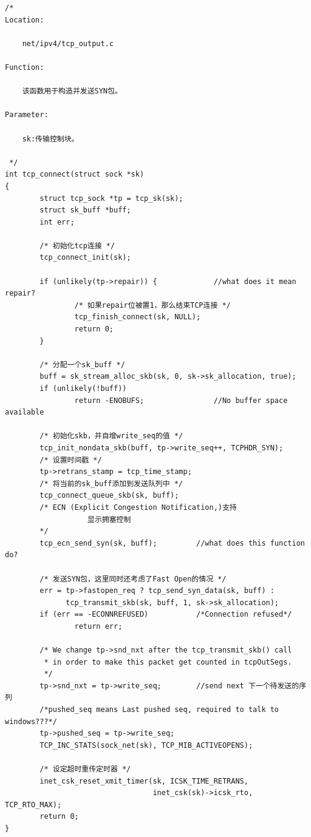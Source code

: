 \begin{verbatim}
/* 
Location:

    net/ipv4/tcp_output.c

Function:

    该函数用于构造并发送SYN包。

Parameter:

    sk:传输控制块。

 */
int tcp_connect(struct sock *sk)
{
        struct tcp_sock *tp = tcp_sk(sk);
        struct sk_buff *buff;
        int err;

        /* 初始化tcp连接 */
        tcp_connect_init(sk);

        if (unlikely(tp->repair)) {             //what does it mean repair?
                /* 如果repair位被置1，那么结束TCP连接 */
                tcp_finish_connect(sk, NULL);
                return 0;
        }

        /* 分配一个sk_buff */
        buff = sk_stream_alloc_skb(sk, 0, sk->sk_allocation, true);
        if (unlikely(!buff))
                return -ENOBUFS;                //No buffer space available

        /* 初始化skb，并自增write_seq的值 */
        tcp_init_nondata_skb(buff, tp->write_seq++, TCPHDR_SYN);
        /* 设置时间戳 */
        tp->retrans_stamp = tcp_time_stamp;
        /* 将当前的sk_buff添加到发送队列中 */
        tcp_connect_queue_skb(sk, buff);
        /* ECN (Explicit Congestion Notification,)支持 
                   显示拥塞控制
        */
        tcp_ecn_send_syn(sk, buff);         //what does this function do?

        /* 发送SYN包，这里同时还考虑了Fast Open的情况 */
        err = tp->fastopen_req ? tcp_send_syn_data(sk, buff) :
              tcp_transmit_skb(sk, buff, 1, sk->sk_allocation);
        if (err == -ECONNREFUSED)           /*Connection refused*/
                return err;

        /* We change tp->snd_nxt after the tcp_transmit_skb() call
         * in order to make this packet get counted in tcpOutSegs.
         */
        tp->snd_nxt = tp->write_seq;        //send next 下一个待发送的序列
        /*pushed_seq means Last pushed seq, required to talk to windows???*/        
        tp->pushed_seq = tp->write_seq;
        TCP_INC_STATS(sock_net(sk), TCP_MIB_ACTIVEOPENS);

        /* 设定超时重传定时器 */
        inet_csk_reset_xmit_timer(sk, ICSK_TIME_RETRANS,
                                  inet_csk(sk)->icsk_rto, TCP_RTO_MAX);
        return 0;
}
\end{verbatim}


